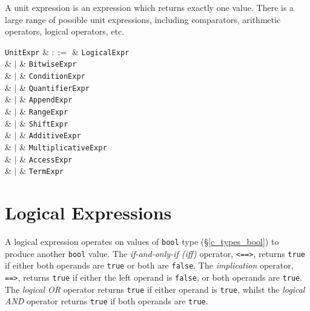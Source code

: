 A unit expression is an expression which returns exactly one value.  There is a large range of possible unit expressions, including comparators, arithmetic operators, logical operators, etc.

\begin{syntax}
  \verb+UnitExpr+ & $::=$ & \verb+LogicalExpr+\\
                  &  $|$  & \verb+BitwiseExpr+\\
                  &  $|$  & \verb+ConditionExpr+\\
                  &  $|$  & \verb+QuantifierExpr+\\
                  &  $|$  & \verb+AppendExpr+\\
                  &  $|$  & \verb+RangeExpr+\\
                  &  $|$  & \verb+ShiftExpr+\\
                  &  $|$  & \verb+AdditiveExpr+\\
                  &  $|$  & \verb+MultiplicativeExpr+\\
                  &  $|$  & \verb+AccessExpr+\\
                  &  $|$  & \verb+TermExpr+\\
                
\end{syntax}


\section{Logical Expressions}
\label{c_expr_logical}

A logical expression operates on values of \lstinline{bool} type (\S\ref{c_types_bool}) to produce another \lstinline{bool} value.  The {\em if-and-only-if (iff)} operator, \lstinline{<==>}, returns \lstinline{true} if either both operands are \lstinline{true} or both are \lstinline{false}.  The {\em implication} operator, \lstinline{==>}, returns \lstinline{true} if either the left operand is \lstinline{false}, or both operands are \lstinline{true}.  The {\em logical OR} operator returns \lstinline{true} if either operand is \lstinline{true}, whilst the {\em logical AND} operator returns \lstinline{true} if both operands are \lstinline{true}.

